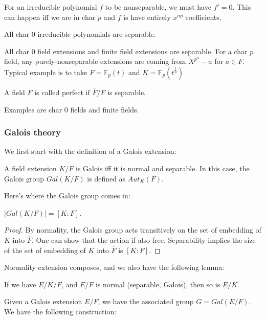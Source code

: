 \documentclass[main.tex]{subfiles}
\begin{document}
For an irreducible polynomial $f$ to be nonseparable, we must have $f' = 0$. This can happen iff we are in char $p$ and $f$ is have entirely $x^{np}$ coefficients. 

\begin{example}
All char $0$ irreducible polynomials are separable. 

All char 0 field extensions and finite field extensions are separable. For a char $p$ field, any purely-nonseparable extensions are coming from $X^{p^n} - a$ for $a \in F$. 
Typical example is to take $F = \mathbb{F}_p (t)$ and $K = \mathbb{F}_p (t^{\frac{1}{p}})$
\end{example}

\begin{definition}
A field $F$ is called perfect if $\overline{F}/F$ is separable.
\end{definition}

Examples are char 0 fields and finite fields.


\subsubsection{Galois theory}
We first start with the definition of a Galois extension:

\begin{definition}
A field extension $K/F$ is Galois iff it is normal and separable. In this case, the Galois group $Gal(K/F)$ is defined as $Aut_K(F)$.
\end{definition}

Here's where the Galois group comes in:
\begin{lemma}
$|Gal(K/F)| = [K: F]$.
\end{lemma}

\begin{proof}
By normality, the Galois group acts transitively on the set of embedding of $K$ into $\overline{F}$. One can show that the action if also free. Separability implies the size of the set of embedding of $K$ into $\overline{F}$ is $[K:F]$.
\end{proof}

Normality extension composes, and we also have the following lemma:
\begin{lemma}
If we have $E/K/F$, and $E/F$ is normal (separable, Galois), then so is $E/K$.
\end{lemma}

Given a Galois extension $E/F$, we have the associated group $G = Gal(E/F)$. We have the following construction:
\end{document}
